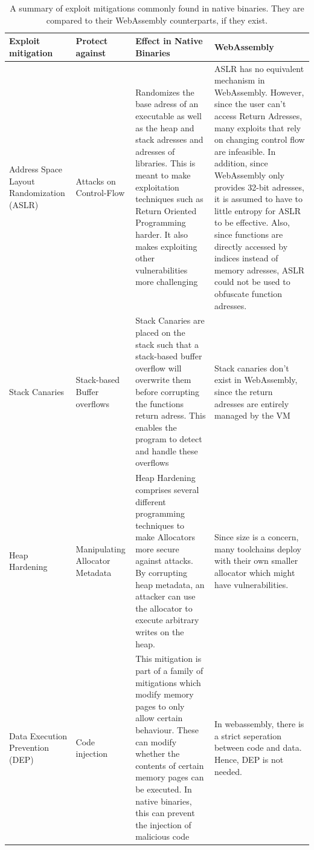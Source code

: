 \documentclass[sigconf]{acmart}
\begin{document}
\begin{table}
\begin{tabular}{p{2cm} | p{2cm} | p{6cm} | p{6cm} }
  \toprule
  Exploit mitigation & Protect against & Effect in Native Binaries & WebAssembly \\
  \midrule
  Address Space Layout Randomization (ASLR) & Attacks on Control-Flow & Randomizes the base adress of an executable as well as the heap and stack adresses and adresses of libraries. This is meant to make exploitation techniques such as Return Oriented Programming harder. It also makes exploiting other vulnerabilities more challenging& ASLR has no equivalent mechanism in WebAssembly. However, since the user can't access Return Adresses, many exploits that rely on changing control flow are infeasible. In addition, since WebAssembly only provides 32-bit adresses, it is assumed to have to little entropy for ASLR to be effective. Also, since functions are directly accessed by indices instead of memory adresses, ASLR could not be used to obfuscate function adresses. \\ \hline
   Stack Canaries & Stack-based Buffer overflows & Stack Canaries are placed on the stack such that a stack-based buffer overflow will overwrite them before corrupting the functions return adress. This enables the program to detect and handle these overflows & Stack canaries don't exist in WebAssembly, since the return adresses are entirely managed by the VM \\ \hline
   Heap Hardening & Manipulating Allocator Metadata & Heap Hardening comprises several different programming techniques to make Allocators more secure against attacks. By corrupting heap metadata, an attacker can use the allocator to execute arbitrary writes on the heap. & Since size is a concern, many toolchains deploy with their own smaller allocator which might have vulnerabilities.\\ \hline
   Data Execution Prevention (DEP) & Code injection & This mitigation is part of a family of mitigations which modify memory pages to only allow certain behaviour. These can modify whether the contents of certain memory pages can be executed. In native binaries, this can prevent the injection of malicious code & In webassembly, there is a strict seperation between code and data. Hence, DEP is not needed.
\end{tabular}
\label{table:exploit_mitigation_wasm}
\caption{A summary of exploit mitigations commonly found in native binaries. They are compared to their WebAssembly counterparts, if they exist.}
\end{table}
\end{document}
